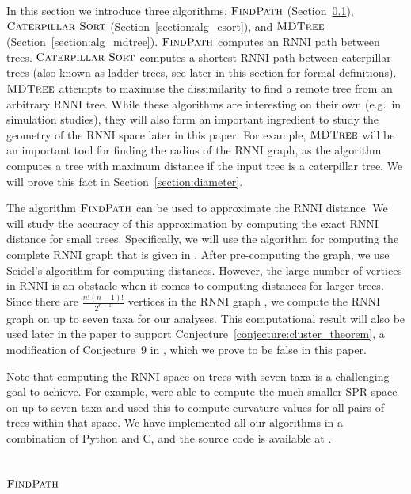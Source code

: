 \documentclass{amsart}
\newcommand{\rnni}{\mathrm{RNNI}}
\newcommand{\spr}{\mathrm{SPR}}
\newcommand{\csort}{\textsc{Caterpillar Sort}}
\newcommand{\findpath}{\textsc{FindPath}}
\newcommand{\mdtree}{\textsc{MDTree}}
\begin{document}
In this section we introduce three algorithms, $\findpath$ (Section~\ref{section:alg_findpath}), $\csort$ (Section~\ref{section:alg_csort}), and $\mdtree$ (Section~\ref{section:alg_mdtree}).
$\findpath$ computes an $\rnni$ path between trees.
$\csort$ computes a shortest $\rnni$ path between caterpillar trees (also known as ladder trees, see later in this section for formal definitions).
$\mdtree$ attempts to maximise the dissimilarity to find a remote tree from an arbitrary $\rnni$ tree.
While these algorithms are interesting on their own (e.g.\ in simulation studies), they will also form an important ingredient to study the geometry of the $\rnni$ space later in this paper.
For example, $\mdtree$ will be an important tool for finding the radius of the $\rnni$ graph, as the algorithm computes a tree with maximum distance if the input tree is a caterpillar tree.
We will prove this fact in Section~\ref{section:diameter}.

The algorithm $\findpath$ can be used to approximate the $\rnni$ distance.
We will study the accuracy of this approximation by computing the exact $\rnni$ distance for small trees.
Specifically, we will use the algorithm for computing the complete $\rnni$ graph that is given in \autocite[Section 3.3]{Gavryushkin2018-ol}.
After pre-computing the graph, we use Seidel's algorithm \autocite{seidel_all-pairs-shortest-path_1995} for computing distances.
However, the large number of vertices in $\rnni$ is an obstacle when it comes to computing distances for larger trees.
Since there are $\frac{n!(n-1)!}{2^{n-1}}$ vertices in the $\rnni$ graph \autocite{Gavryushkin2018-ol}, we compute the $\rnni$ graph on up to seven taxa for our analyses.
This computational result will also be used later in the paper to support Conjecture~\ref{conjecture:cluster_theorem}, a modification of Conjecture~9 in \autocite{Gavryushkin2018-ol}, which we prove to be false in this paper.

Note that computing the $\rnni$ space on trees with seven taxa is a challenging goal to achieve.
For example, \textcite{Whidden2016-kl} were able to compute the much smaller $\spr$ space on up to seven taxa and used this to compute curvature values for all pairs of trees within that space.
We have implemented all our algorithms in a combination of Python and C, and the source code is available at \autocite{Collienne2019}.


\subsection{$\findpath$}
\label{section:alg_findpath}
\end{document}

